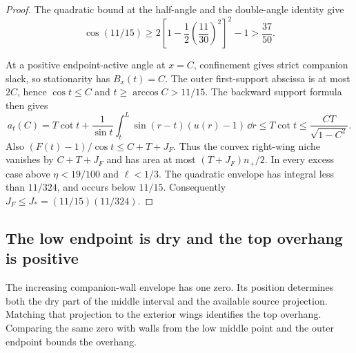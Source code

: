 \begin{proof}
The quadratic bound at the half-angle and the double-angle identity give
\[
 \cos(11/15)\ge2\left[1-\frac12\left(\frac{11}{30}\right)^2\right]^2-1
 >\frac{37}{50}.
\]

At a positive endpoint-active angle at $x=C$, confinement gives
strict companion slack, so stationarity has $B_x(t)=C$.
The outer first-support abscissa is at most $2C$, hence
$\cos t\le C$ and $t\ge\arccos C>11/15$.
The backward support formula then gives
\[
 a_t(C)=T\cot t+\frac1{\sin t}
       \int_t^L\sin(r-t)(u(r)-1)\,\dd r
       \le T\cot t\le\frac{CT}{\sqrt{1-C^2}}.
\]
Also $(F(t)-1)/\cos t\le C+T+J_F$.
Thus the convex right-wing niche vanishes by $C+T+J_F$ and has
area at most $(T+J_F)n_+/2$.
In every excess case above $\eta<19/100$ and $\ell<1/3$.
The quadratic envelope has integral less than $11/324$,
and occurs below $11/15$. Consequently
$J_F\le J_*=(11/15)(11/324)$.
\end{proof}

\subsection{The low endpoint is dry and the top overhang is positive}

The increasing companion-wall envelope has one zero. Its position
determines both the dry part of the middle interval and the available
source projection. Matching that projection to the exterior wings
identifies the top overhang. Comparing the same zero with walls from
the low middle point and the outer endpoint bounds the overhang.

